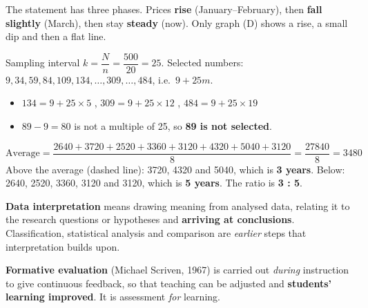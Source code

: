 The statement has three phases. Prices \textbf{rise} (January--February), then \textbf{fall slightly} (March), then stay \textbf{steady} (now). Only graph (D) shows a rise, a small dip and then a flat line.

Sampling interval $k=\dfrac{N}{n}=\dfrac{500}{20}=25$. Selected numbers: $9, 34, 59, 84, 109, 134, \ldots, 309, \ldots, 484$, i.e.\ $9+25m$.
\begin{itemize}
\item $134=9+25\times5$ \checkmark, $309=9+25\times12$ \checkmark, $484=9+25\times19$ \checkmark
\item $89-9=80$ is not a multiple of 25, so \textbf{89 is not selected}.
\end{itemize}


\[\text{Average}=\frac{2640+3720+2520+3360+3120+4320+5040+3120}{8}=\frac{27840}{8}=3480\]
Above the average (dashed line): 3720, 4320 and 5040, which is \textbf{3 years}. Below: 2640, 2520, 3360, 3120 and 3120, which is \textbf{5 years}. The ratio is \textbf{3 : 5}.

\textbf{Data interpretation} means drawing meaning from analysed data, relating it to the research questions or hypotheses and \textbf{arriving at conclusions}. Classification, statistical analysis and comparison are \emph{earlier} steps that interpretation builds upon.

\textbf{Formative evaluation} (Michael Scriven, 1967) is carried out \emph{during} instruction to give continuous feedback, so that teaching can be adjusted and \textbf{students' learning improved}. It is assessment \emph{for} learning.

